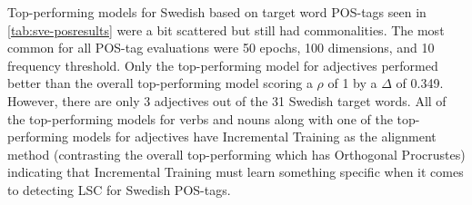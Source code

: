 Top-performing models for Swedish based on target word POS-tags seen in \autoref{tab:sve-posresults} were a bit scattered but still had commonalities. The most common for all POS-tag evaluations were 50 epochs, 100 dimensions, and 10 frequency threshold. Only the top-performing model for adjectives performed better than the overall top-performing model scoring a $\rho$ of 1 by a $\Delta$ of 0.349. However, there are only 3 adjectives out of the 31 Swedish target words. All of the top-performing models for verbs and nouns along with one of the top-performing models for adjectives have Incremental Training as the alignment method (contrasting the overall top-performing which has Orthogonal Procrustes) indicating that Incremental Training must learn something specific when it comes to detecting LSC for Swedish POS-tags. 


